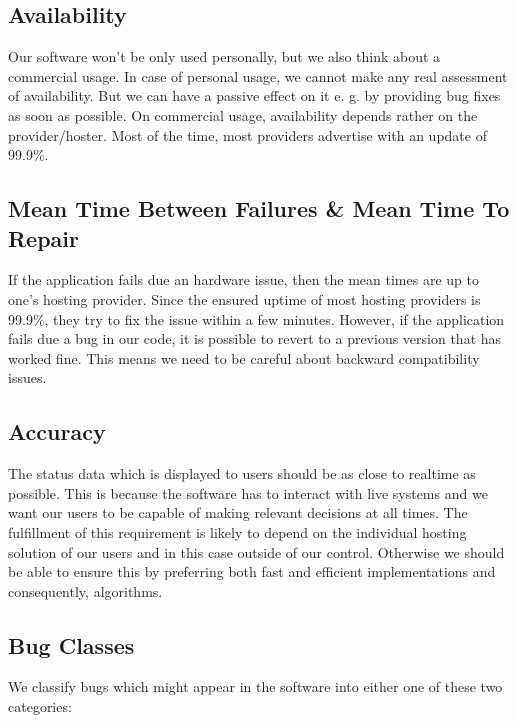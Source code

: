 \documentclass[a4paper,12pt,chapterprefix=false,bibliography=totoc,listof=totoc,]{scrreprt}
\begin{document}

\subsection{Availability}
Our software won't be only used personally, but we also think about a commercial usage.
In case of personal usage, we cannot make any real assessment of availability. But we can have a passive effect on it e. g. by providing bug fixes as soon as possible.
On commercial usage, availability depends rather on the provider/hoster. Most of the time, most providers advertise with an update of 99.9\%.

\subsection{Mean Time Between Failures \& Mean Time To Repair}
If the application fails due an hardware issue, then the mean times are up to one's hosting provider. Since the ensured uptime of most hosting providers is 99.9\%, they try to fix the issue within a few minutes. However, if the application fails due a bug in our code, it is possible to revert to a previous version that has worked fine. This means we need to be careful about backward compatibility issues.

\subsection{Accuracy}
The status data which is displayed to users should be as close to realtime as possible. This is because the software has to interact with live systems and we want our users to be capable of making relevant decisions at all times. The fulfillment of this requirement is likely to depend on the individual hosting solution of our users and in this case outside of our control. Otherwise we should be able to ensure this by preferring both fast and efficient implementations and consequently, algorithms.

\subsection{Bug Classes}
We classify bugs which might appear in the software into either one of these two categories:
\end{document}
